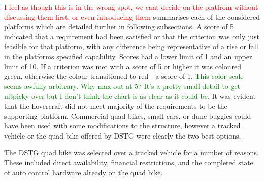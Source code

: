 \documentclass[main.tex]{subfiles}
\begin{document}
 \textcolor{red}{I feel as though this is in the wrong spot, we cant decide on the platfrom without discussing them first, or even introducing them} summarises each of the considered platforms which are detailed further in following subsections. A score of 5 indicated that a requirement had been satisfied or that the criterion was only just feasible for that platform, with any difference being representative of a rise or fall in the platforms specified capability. Scores had a lower limit of 1 and an upper limit of 10. If a criterion was met with a score of 5 or higher it was coloured green, otherwise the colour transitioned to red - a score of 1. 
\textcolor{green}{This color scale seems awfully arbitrary. Why max out at 5? It's a pretty small detail to get nitpicky over but I don't think the chart is as clear as it could be.} It was evident that the hovercraft did not meet majority of the requirements to be the supporting platform. Commercial quad bikes, small cars, or dune buggies could have been used with some modifications to the structure, however a tracked vehicle or the quad bike offered by DSTG were clearly the two best options.

The DSTG quad bike was selected over a tracked vehicle for a number of reasons. These included direct availability, financial restrictions, and the completed state of auto control hardware already on the quad bike.
\end{document}
